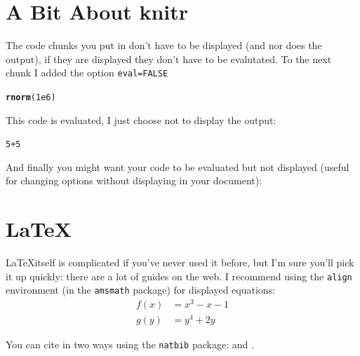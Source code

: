 \documentclass{article}\usepackage[]{graphicx}\usepackage[]{color}
\makeatletter
\newcommand{\hlnum}[1]{\textcolor[rgb]{0.686,0.059,0.569}{#1}}%
\newcommand{\hlopt}[1]{\textcolor[rgb]{0,0,0}{#1}}%
\newcommand{\hlstd}[1]{\textcolor[rgb]{0.345,0.345,0.345}{#1}}%
\newcommand{\hlkwd}[1]{\textcolor[rgb]{0.737,0.353,0.396}{\textbf{#1}}}%
\newenvironment{kframe}{%
 \def\at@end@of@kframe{}%
 \ifinner\ifhmode%
  \def\at@end@of@kframe{\end{minipage}}%
  \begin{minipage}{\columnwidth}%
 \fi\fi%
 \def\FrameCommand##1{\hskip\@totalleftmargin \hskip-\fboxsep
 \colorbox{shadecolor}{##1}\hskip-\fboxsep
     \hskip-\linewidth \hskip-\@totalleftmargin \hskip\columnwidth}%
 \MakeFramed {\advance\hsize-\width
   \@totalleftmargin\z@ \linewidth\hsize
   \@setminipage}}%
 {\par\unskip\endMakeFramed%
 \at@end@of@kframe}
\newenvironment{knitrout}{}{} %
\makeatother
\begin{document}
\section{A Bit About knitr}

The code chunks you put in don't have to be displayed (and nor does the output),
if they are displayed they don't have to be evalutated.  To the next chunk I added
the option \verb|eval=FALSE|
\begin{knitrout}
\color{fgcolor}\begin{kframe}
\begin{alltt}
\hlkwd{rnorm}\hlstd{(}\hlnum{1e6}\hlstd{)}
\end{alltt}
\end{kframe}
\end{knitrout}
This code is evaluated, I just choose not to display the output:
\begin{knitrout}
\color{fgcolor}\begin{kframe}
\begin{alltt}
\hlnum{5}\hlopt{+}\hlnum{5}
\end{alltt}
\end{kframe}
\end{knitrout}
And finally you might want your code to be evaluated but not displayed (useful for
changing options without displaying in your document):


\section{\LaTeX}

\LaTeX itself is complicated if you've never used it before, but I'm sure you'll
pick it up quickly: there are a lot of guides on the web.  I recommend using the
\texttt{align} environment (in the \texttt{amsmath} package) for displayed equations:
\begin{align*}
f(x) &= x^3 - x - 1\\
g(y) &= y^4 + 2y
\end{align*}

You can cite in two ways using the \texttt{natbib} package:
\citep{articlekey}
and
\citet{articlekey}.



\end{document}
